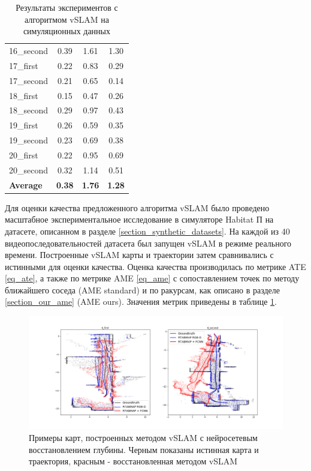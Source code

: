 \documentclass{mipt-thesis-ms}
\begin{document}
\begin{table}
\begin{tabular}{l|c|c|c}
			16\_second & 0.39 & 1.61 & 1.30 \\
			17\_first & 0.22 & 0.83 & 0.29 \\
			17\_second & 0.21 & 0.65 & 0.14 \\
			18\_first & 0.15 & 0.47 & 0.26 \\
			18\_second & 0.29 & 0.97 & 0.43 \\
			19\_first & 0.26 & 0.59 & 0.35 \\
			19\_second & 0.23 & 0.69 & 0.38 \\
			20\_first & 0.22 & 0.95 & 0.69 \\
			20\_second & 0.32 & 1.14 & 0.51 \\
			\hline
			\textbf{Average}                       &   \textbf{0.38}                          & \textbf{1.76}                          & \textbf{1.28}\\                         
		\end{tabular}
		\caption{Результаты экспериментов с алгоритмом vSLAM на симуляционных данных}
		\label{table_maomaps_results}
	\end{table}
	
	Для оценки качества предложенного алгоритма vSLAM было проведено масштабное экспериментальное исследование в симуляторе Habitat \cite{savva2019habitat}П на датасете, описанном в разделе \ref{section_synthetic_datasets}. На каждой из 40 видеопоследовательностей датасета был запущен vSLAM в режиме реального времени. Построенные vSLAM карты и траектории затем сравнивались с истинными для оценки качества. Оценка качества производилась по метрике ATE \ref{eq_ate}, а также по метрике AME \ref{eq_ame} с сопоставлением точек по методу ближайшего соседа (AME standard) и по ракурсам, как описано в разделе \ref{section_our_ame} (AME ours). Значения метрик приведены в таблице \ref{table_maomaps_results}.
	
	\begin{figure}
		\includegraphics[width=1.0\textwidth]{img/fcnn_maps_sample6.png}
		\caption{Примеры карт, построенных методом vSLAM с нейросетевым восстановлением глубины. Черным показаны истинная карта и траектория, красным - восстановленная методом vSLAM}
		\label{figure_slam_map_example}
	\end{figure}
	
\end{document}
